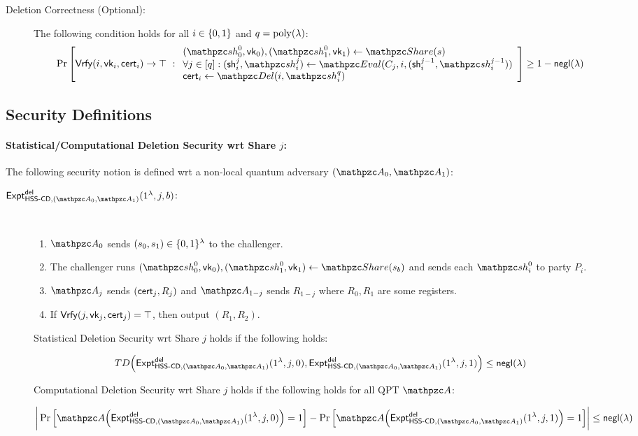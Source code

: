 \begin{description}
\item [Deletion Correctness (Optional):] The following condition
holds for all $i \in \{0,1\}$ and $q = {\mathrm{poly}}(\lambda)$:
\begin{align}
\Pr\left[
\Vrfy(i, \vk_i, \cert_i) \rightarrow \top
\ :
\begin{array}{ll}
(\qsh_0^0, \vk_0), (\qsh_1^0, \vk_1) \gets \Sh(s)\\
\forall j \in [q]: (\sh_i^j, \qsh_i^j) \leftarrow \Ev(C_j, i,
(\sh_i^{j-1}, \qsh_i^{j-1}))\\
\cert_i \leftarrow \Del(i, \qsh_i^q)
\end{array}
\right] \geq 1 - \negl(\secp)
\end{align}

\end{description}



\subsection{Security Definitions}
\paragraph{Statistical/Computational Deletion Security wrt Share $j$:}
The following security notion is defined wrt a non-local quantum
adversary $(\qA_0, \qA_1)$:

\begin{description}
\item [$\expa{\HSScd, (\qA_0, \qA_1)}{del}(1^\secp, j, b)$:] $ $
\begin{enumerate}
\item $\qA_0$ sends $(s_0, s_1) \in \{0,1\}^\lambda$ to the challenger.
\item 
The challenger runs
$(\qsh_0^0, \vk_0), (\qsh_1^0, \vk_1) \gets \Sh(s_b)$ and sends each
$\qsh_i^0$ to party $P_i$.

\item $\qA_j$ sends $(\mathsf{cert}_j, R_j)$ and $\qA_{1-j}$ sends $R_{1-j}$
where $R_0, R_1$ are some registers.
\item If $\mathsf{Vrfy}(j, \mathsf{vk}_j, \mathsf{cert}_j) = \top$, then output $(R_1, R_2)$.
\end{enumerate}

Statistical Deletion Security wrt Share $j$ holds if the following
holds:

$$TD\Big(\expa{\HSScd, (\qA_0, \qA_1)}{del}(1^\secp, j,
0), \expa{\HSScd, (\qA_0, \qA_1)}{del}(1^\secp, j,
1)\Big) \le \negl(\secp)$$

Computational Deletion Security wrt Share $j$ holds if the following
holds for all QPT $\qA$:

$$\bigg\lvert \Pr\Big[\qA\Big(\expa{\HSScd, (\qA_0,
\qA_1)}{del}(1^\secp, j, 0)\Big)=1\Big] -
\Pr\Big[\qA\Big(\expa{\HSScd, (\qA_0,
\qA_1)}{del}(1^\secp, j, 1)\Big)=1\Big]
\bigg\rvert \le \negl(\secp)$$

\end{description}

